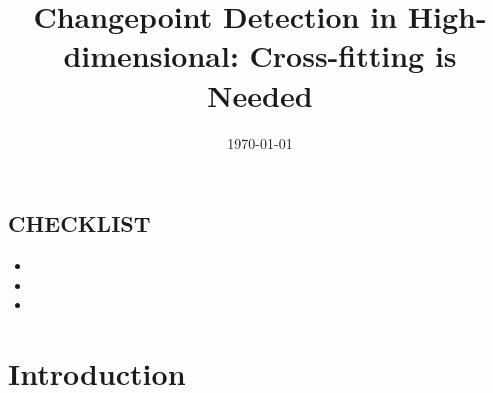 \documentclass[12pt]{article}
\theoremstyle{definition}
\theoremstyle{remark}
\numberwithin{equation}{section}
\numberwithin{figure}{section}
\numberwithin{table}{section}
\begin{document}
\title{Changepoint Detection in High-dimensional: Cross-fitting is Needed}
\author{}
\date{\today}

\maketitle



\subsection*{CHECKLIST}
\begin{itemize}
    \tightlist
    \item[\checked] 
    \item[\failed] 
    \item[\unchecked] 
\end{itemize}

\section{Introduction}\label{sec:intro}




\newpage
\appendix
\end{document}
